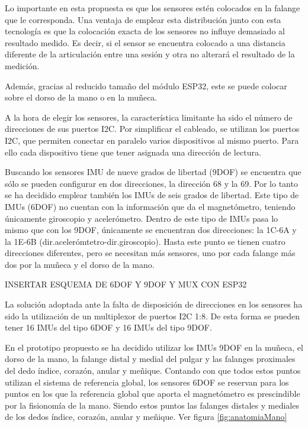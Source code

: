  Lo importante en esta propuesta es que los sensores estén colocados en la falange que le corresponda. Una ventaja de emplear esta distribución junto con esta tecnología es que la colocación exacta de los sensores no influye demasiado al resultado medido. Es decir, si el sensor se encuentra colocado a una distancia diferente de la articulación entre una sesión y otra no alterará el resultado de la medición.

Además, gracias al reducido tamaño del módulo ESP32, este se puede colocar sobre el dorso de la mano o en la muñeca. 

A la hora de elegir los sensores, la característica limitante ha sido el número de direcciones de sus puertos I2C. Por simplificar el cableado, se utilizan los puertos I2C, que permiten conectar en paralelo varios dispositivos al mismo puerto. Para ello cada dispositivo tiene que tener asignada una dirección de lectura. 

Buscando los sensores IMU de nueve grados de libertad (9DOF) se encuentra que sólo se pueden configurar en dos direcciones, la dirección 68 y la 69. Por lo tanto se ha decidido emplear también los IMUs de seis grados de libertad. Este tipo de IMUs (6DOF) no cuentan con la información que da el magnetómetro, teniendo únicamente giroscopio y acelerómetro. Dentro de este tipo de IMUs pasa lo mismo que con los 9DOF, únicamente se encuentran dos direcciones: la 1C-6A y la 1E-6B (dir.acelerómtetro-dir.giroscopio). Hasta este punto se tienen cuatro direcciones diferentes, pero se necesitan más sensores, uno por cada falange más dos por la muñeca y el dorso de la mano. 

\textcolor{rositaoscuro}{INSERTAR ESQUEMA DE 6DOF Y 9DOF Y MUX CON ESP32}

La solución adoptada ante la falta de disposición de direcciones en los sensores ha sido la utilización de un multiplexor de puertos I2C 1:8. De esta forma se pueden tener 16 IMUs del tipo 6DOF y 16 IMUs del tipo 9DOF.

En el prototipo propuesto se ha decidido utilizar los IMUs 9DOF en la muñeca, el dorso de la mano, la falange distal y medial del pulgar y las falanges proximales del dedo índice, corazón, anular y meñique. Contando con que todos estos puntos utilizan el sistema de referencia global, los sensores 6DOF se reservan para los puntos en los que la referencia global que aporta el magnetómetro es prescindible por la fisionomía de la mano. Siendo estos puntos las falanges distales y mediales de los dedos índice, corazón, anular y meñique. Ver figura \ref{fig:anatomiaMano}


